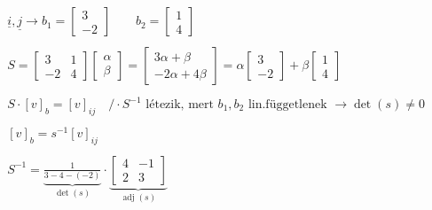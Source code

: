 \begin{comment}
\begin{center}
2022. február 17.

Gyakorlatvezető: Dr. Ács Bernadett

Témakör: Bázistranszformáció
\end{center}
\end{comment}


\subsection{}
$$
\begin{aligned}
&\underline{i}, \underline{j} \rightarrow b_{1}=\left[\begin{array}{c}3 \\-2\end{array}\right]  \qquad b_{2}=\left[\begin{array}{l}1 \\4\end{array}\right] \\
\\
& S=\left[\begin{array}{cc}3 & 1 \\-2 & 4\end{array}\right]\left[\begin{array}{c} \alpha \\ \beta \end{array}\right] = \left[\begin{array}{c}3 \alpha+\beta \\-2 \alpha+4 \beta\end{array}\right]=\alpha\left[\begin{array}{c}3 \\-2\end{array}\right]+\beta\left[\begin{array}{l}1 \\4\end{array}\right] \\
\\
& S \cdot[v]_{b}=[v]_{i j} \quad / \cdot S^{-1} \text {  létezik, mert } b_{1}, b_{2}{ } \text { lin.függetlenek }\rightarrow\operatorname{det}(s) \neq 0\\
\\
& [v]_{b}=s^{-1}[v]_{i j} \quad  \quad   \\
\\
& S^{-1}=\underbrace{\frac{1}{3-4-(-2)}}_{\operatorname{det}(s)} \cdot \underbrace{\left[\begin{array}{cc}4 & -1 \\2 & 3\end{array}\right]}_{\operatorname{adj}(s)}
\end{aligned}
$$

